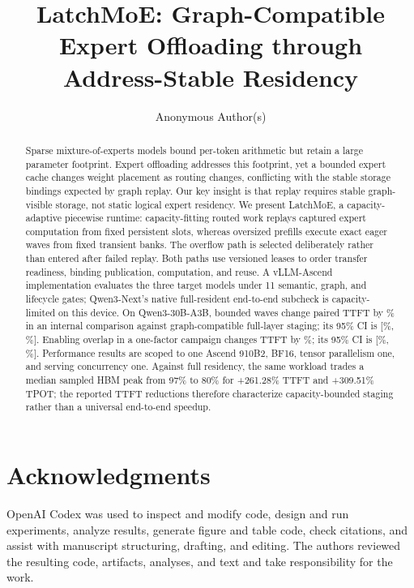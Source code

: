 \documentclass[sigplan,anonymous,review,nonacm]{acmart}
\title{LatchMoE: Graph-Compatible Expert Offloading through Address-Stable Residency}
\author{Anonymous Author(s)}
\newcommand{\system}{LatchMoE\xspace}
\begin{document}

\begin{abstract}
Sparse mixture-of-experts models bound per-token arithmetic but retain a large
parameter footprint. Expert offloading addresses this footprint, yet a bounded
expert cache changes weight placement as routing changes, conflicting with the
stable storage bindings expected by graph replay. Our key insight is that
replay requires stable graph-visible storage, not static logical expert
residency. We present \system, a capacity-adaptive piecewise runtime:
capacity-fitting routed work replays captured expert computation from fixed
persistent slots, whereas oversized prefills execute exact eager waves from
fixed transient banks. The overflow path is selected deliberately rather than
entered after failed replay. Both paths use versioned leases to order transfer
readiness, binding publication, computation, and reuse. A vLLM-Ascend
implementation evaluates
the three target models under 11 semantic, graph, and lifecycle gates;
Qwen3-Next's native full-resident end-to-end subcheck is capacity-limited on
this device. On Qwen3-30B-A3B, bounded waves
change paired TTFT by \BoundedTTFTEffect\% in an internal comparison against
graph-compatible full-layer staging; its 95\% CI is [\BoundedTTFTLower\%,
\BoundedTTFTUpper\%]. Enabling overlap in a one-factor campaign changes TTFT by
\OverlapTTFTEffect\%; its 95\% CI is [\OverlapTTFTLower\%,
\OverlapTTFTUpper\%]. Performance results are scoped to
one Ascend 910B2, BF16, tensor parallelism one, and serving concurrency one.
Against full residency, the same workload trades a median sampled HBM peak
from 97\% to 80\% for +261.28\% TTFT and +309.51\% TPOT; the reported TTFT
reductions therefore characterize capacity-bounded staging rather than a
universal end-to-end speedup.
\end{abstract}
\maketitle











\section*{Acknowledgments}
OpenAI Codex was used to inspect and modify code, design and run experiments,
analyze results, generate figure and table code, check citations, and assist
with manuscript structuring, drafting, and editing. The authors reviewed the
resulting code, artifacts, analyses, and text and take responsibility for the
work.



\end{document}
